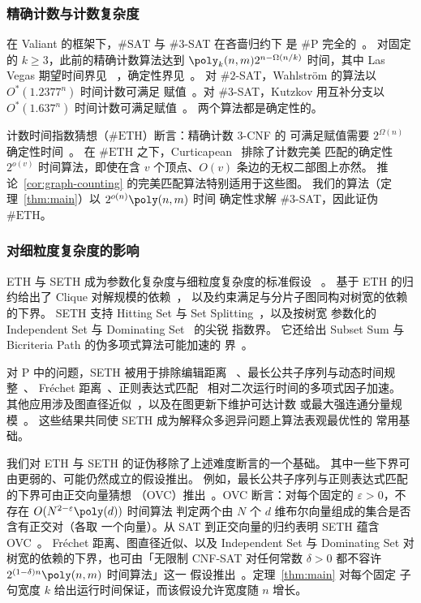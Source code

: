 \subsubsection{精确计数与计数复杂度}\label{subsec:related-counting}
在 Valiant 的框架下，$\#\mathrm{SAT}$ 与 $\#3$-SAT 在吝啬归约下
是 $\#\mathrm P$ 完全的~\cite[Section~3, Facts~1--2]{Val79}。
对固定的 $k\ge3$，此前的精确计数算法达到
$\poly_k(n,m)2^{n-\Omega(n/k)}$ 时间，其中 Las Vegas 期望时间界见
~\cite[Lemma~3.5]{IMP12}，确定性界见~\cite[Theorem~1.6]{CW21}。
对 $\#2$-SAT，Wahlstr\"om 的算法以 $O^*(1.2377^n)$ 时间计数可满足
赋值~\cite{Wahlstrom08}。对 $\#3$-SAT，Kutzkov 用互补分支以
$O^*(1.637^n)$ 时间计数可满足赋值~\cite{Kutzkov26}。
两个算法都是确定性的。

计数时间指数猜想（$\#\mathrm{ETH}$）断言：精确计数 $3$-CNF 的
可满足赋值需要 $2^{\Omega(n)}$ 确定性时间~\cite[Section~1]{DHMTW}。
在 $\#\mathrm{ETH}$ 之下，Curticapean~\cite{Cur18} 排除了计数完美
匹配的确定性 $2^{o(v)}$ 时间算法，即使在含 $v$ 个顶点、$O(v)$
条边的无权二部图上亦然。
推论~\ref{cor:graph-counting} 的完美匹配算法特别适用于这些图。
我们的算法（定理~\ref{thm:main}）以 $2^{o(n)}\poly(n,m)$ 时间
确定性求解 $\#3$-SAT，因此证伪 $\#\mathrm{ETH}$。

\subsubsection{对细粒度复杂度的影响}\label{subsec:related-consequences}
ETH 与 SETH 成为参数化复杂度与细粒度复杂度的标准假设
~\cite{IPZ,VW19}。
基于 ETH 的归约给出了 Clique 对解规模的依赖~\cite{CHKX06}，
以及约束满足与分片子图同构对树宽的依赖~\cite{Marx10} 的下界。
SETH 支持 Hitting Set 与 Set Splitting~\cite{CDL16}，以及按树宽
参数化的 Independent Set 与 Dominating Set~\cite{LMS18} 的尖锐
指数界。
它还给出 Subset Sum 与 Bicriteria Path 的伪多项式算法可能加速的
界~\cite{ABHS19}。

对 $\mathrm P$ 中的问题，SETH 被用于排除编辑距离
~\cite{BackursIndyk18}、最长公共子序列与动态时间规整~\cite{BK15}、
Fr\'echet 距离~\cite{Bri14}、正则表达式匹配~\cite{BI16}
相对二次运行时间的多项式因子加速。
其他应用涉及图直径近似~\cite{RV13}，以及在图更新下维护可达计数
或最大强连通分量规模~\cite{AW14}。
这些结果共同使 SETH 成为解释众多迥异问题上算法表观最优性的
常用基础。

我们对 ETH 与 SETH 的证伪移除了上述难度断言的一个基础。
其中一些下界可由更弱的、可能仍然成立的假设推出。
例如，最长公共子序列与正则表达式匹配的下界可由正交向量猜想
（OVC）推出~\cite{BK15,BI16}。OVC 断言：对每个固定的
$\varepsilon>0$，不存在 $O(N^{2-\varepsilon}\poly(d))$ 时间算法
判定两个由 $N$ 个 $d$ 维布尔向量组成的集合是否含有正交对（各取
一个向量）。从 SAT 到正交向量的归约表明 SETH 蕴含
OVC~\cite{Wil05,VW19}。
Fr\'echet 距离、图直径近似、以及 Independent Set 与 Dominating
Set 对树宽的依赖的下界，也可由「无限制 CNF-SAT 对任何常数
$\delta>0$ 都不容许 $2^{(1-\delta)n}\poly(n,m)$ 时间算法」这一
假设推出~\cite{Bri14,RV13,LMS18}。定理~\ref{thm:main} 对每个固定
子句宽度 $k$ 给出运行时间保证，而该假设允许宽度随 $n$ 增长。

